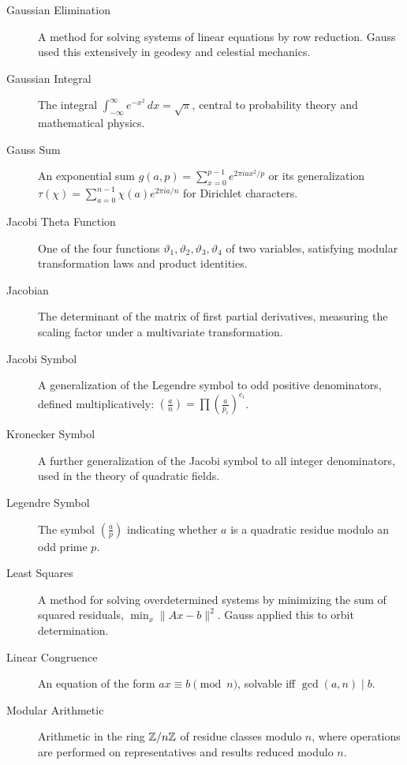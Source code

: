 \begin{description}
\item[Gaussian Elimination] A method for solving systems of linear equations by row reduction. Gauss used this extensively in geodesy and celestial mechanics.

\item[Gaussian Integral] The integral $\int_{-\infty}^{\infty} e^{-x^2}\,dx = \sqrt{\pi}$, central to probability theory and mathematical physics.

\item[Gauss Sum] An exponential sum $g(a,p) = \sum_{x=0}^{p-1} e^{2\pi i ax^2/p}$ or its generalization $\tau(\chi) = \sum_{a=0}^{n-1} \chi(a) e^{2\pi i a/n}$ for Dirichlet characters.

\item[Jacobi Theta Function] One of the four functions $\vartheta_1, \vartheta_2, \vartheta_3, \vartheta_4$ of two variables, satisfying modular transformation laws and product identities.

\item[Jacobian] The determinant of the matrix of first partial derivatives, measuring the scaling factor under a multivariate transformation.

\item[Jacobi Symbol] A generalization of the Legendre symbol to odd positive denominators, defined multiplicatively: $\left(\frac{a}{n}\right) = \prod \left(\frac{a}{p_i}\right)^{e_i}$.

\item[Kronecker Symbol] A further generalization of the Jacobi symbol to all integer denominators, used in the theory of quadratic fields.

\item[Legendre Symbol] The symbol $\left(\frac{a}{p}\right)$ indicating whether $a$ is a quadratic residue modulo an odd prime $p$.

\item[Least Squares] A method for solving overdetermined systems by minimizing the sum of squared residuals, $\min_x \|Ax - b\|^2$. Gauss applied this to orbit determination.

\item[Linear Congruence] An equation of the form $ax \equiv b \pmod{n}$, solvable iff $\gcd(a,n) \mid b$.

\item[Modular Arithmetic] Arithmetic in the ring $\mathbb{Z}/n\mathbb{Z}$ of residue classes modulo $n$, where operations are performed on representatives and results reduced modulo $n$.


\end{description}
